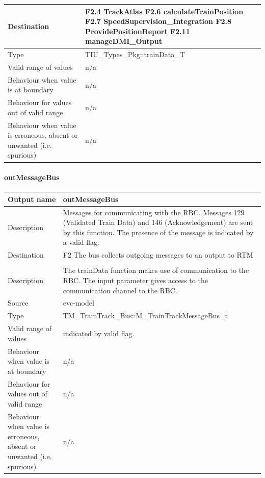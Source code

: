 \begin{longtable}{p{}p{}}
\midrule
Destination				& F2.4 TrackAtlas\newline
F2.6 calculateTrainPosition\newline
F2.7 SpeedSupervision\_Integration\newline
F2.8 ProvidePositionReport\newline
F2.11 manageDMI\_Output 
\\ 
\midrule
Type						& TIU\_Types\_Pkg::trainData\_T \\
\midrule
Valid range of values			& n/a \\
\midrule
Behaviour when value is at boundary	& n/a \\
\midrule
Behaviour for values out of valid range	& n/a \\
\midrule
Behaviour when value is erroneous, absent or unwanted (i.e. spurious) &n/a \\
\bottomrule
\end{longtable}

\paragraph{outMessageBus}

\begin{longtable}{p{}p{}}
\toprule
Output name				& outMessageBus\\
\midrule
Description				& Messages for communicating with the RBC. Messages 129 (Validated Train Data) and 146 (Acknowledgement) are sent by this function. The presence of the message is indicated by a valid flag.\\
\midrule
Destination				& F2 The bus collects outgoing messages to an output to RTM\\ 
\\ 
\midrule
Description				& The trainData function makes use of communication to the RBC. The input parameter gives access to the communication channel to the RBC.
\\
\midrule
Source					& evc-model\\  
\midrule
Type					& TM\_TrainTrack\_Bus::M\_TrainTrackMessageBus\_t\\
\midrule
Valid range of values	& indicated by valid flag. \\
\midrule
Behaviour when value is at boundary	& n/a\\
\midrule
Behaviour for values out of valid range	& n/a \\
\midrule
Behaviour when value is erroneous, absent or unwanted (i.e. spurious) & n/a\\
\bottomrule
\end{longtable}

